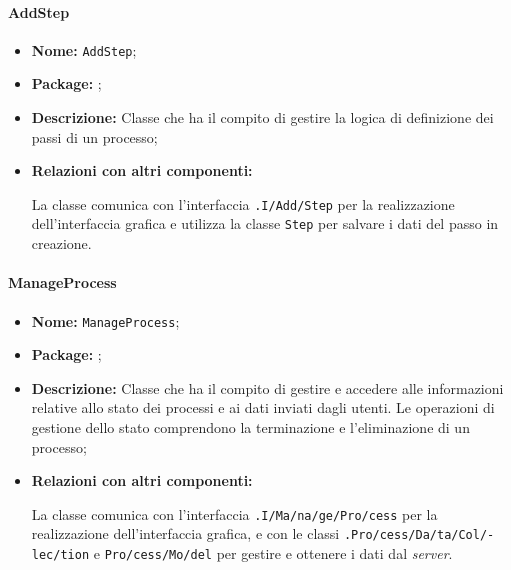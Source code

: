 \paragraph{AddStep}
\begin{flushleft}
\begin{itemize}
\item \textbf{Nome:} \texttt{AddStep};
\item \textbf{Package:} \texttt{\logicAdmin{}};
\item \textbf{Descrizione:} Classe che ha il compito di gestire la logica di definizione dei passi di un processo;
\item \textbf{Relazioni con altri componenti:}
\begin{sloppypar}
La classe comunica con l'interfaccia \texttt{\viewAdmin{}.I\fshyp{}Add\fshyp{}Step} per la realizzazione dell'interfaccia grafica e utilizza la classe \texttt{\model{}Step} per salvare i dati del passo in creazione.
\end{sloppypar}
\end{itemize}
\end{flushleft}

\paragraph{ManageProcess}
\begin{flushleft}
\begin{itemize}
\item \textbf{Nome:} \texttt{ManageProcess};
\item \textbf{Package:} \texttt{\logicAdmin{}};
\item \textbf{Descrizione:} Classe che ha il compito di gestire e accedere alle informazioni relative allo stato dei processi e ai dati inviati dagli utenti. Le operazioni di gestione dello stato comprendono la terminazione e l'eliminazione di un processo;
\item \textbf{Relazioni con altri componenti:}
\begin{sloppypar}
La classe comunica con l'interfaccia \texttt{\viewAdmin{}.I\fshyp{}Ma\fshyp{}na\fshyp{}ge\fshyp{}Pro\fshyp{}cess} per la realizzazione dell'interfaccia grafica, e con le classi \texttt{\collection{}.Pro\fshyp{}cess\fshyp{}Da\fshyp{}ta\fshyp{}Col\fshyp{}lec\fshyp{}tion} e \texttt{\model{}Pro\fshyp{}cess\fshyp{}Mo\fshyp{}del} per gestire e ottenere i dati dal \textit{server}.
\end{sloppypar}
\end{itemize}
\end{flushleft}

